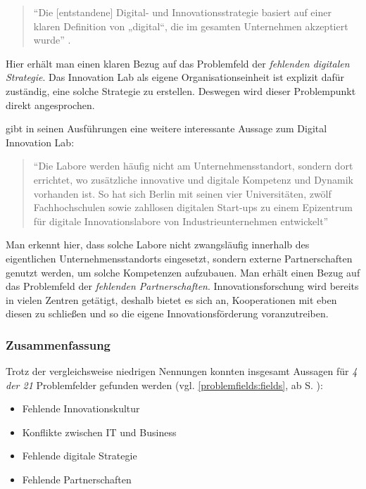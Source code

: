 \begin{quote}
	``Die [entstandene] Digital- und Innovationsstrategie basiert auf einer klaren Definition von „digital“, die im gesamten Unternehmen akzeptiert wurde'' \cite[S. 259]{urbach_digitalization_2018}.
\end{quote}

Hier erhält man einen klaren Bezug auf das Problemfeld der \textit{fehlenden digitalen Strategie}. Das Innovation Lab als eigene Organisationseinheit ist explizit dafür zuständig, eine solche Strategie zu erstellen. Deswegen wird dieser Problempunkt direkt angesprochen.

 gibt in seinen Ausführungen eine weitere interessante Aussage zum Digital Innovation Lab:

\begin{quote}
	``Die Labore werden häufig nicht am Unternehmensstandort, sondern dort errichtet, wo zusätzliche innovative und digitale Kompetenz und Dynamik vorhanden ist. So hat sich Berlin mit seinen vier Universitäten, zwölf Fachhochschulen sowie zahllosen digitalen Start-ups zu einem Epizentrum für digitale Innovationslabore von Industrieunternehmen entwickelt'' \cite[S. 183]{weinreich_lean_2016}
\end{quote}

Man erkennt hier, dass solche Labore nicht zwangsläufig innerhalb des eigentlichen Unternehmensstandorts eingesetzt, sondern externe Partnerschaften genutzt werden, um solche Kompetenzen aufzubauen. Man erhält einen Bezug auf das Problemfeld der \textit{fehlenden Partnerschaften}. Innovationsforschung wird bereits in vielen Zentren getätigt, deshalb bietet es sich an, Kooperationen mit eben diesen zu schließen und so die eigene Innovationsförderung voranzutreiben.

\subsubsection{Zusammenfassung}

Trotz der vergleichsweise niedrigen Nennungen konnten insgesamt Aussagen für \textit{4 der 21} Problemfelder gefunden werden (vgl. \ref{problemfields:fields}, ab S. \pageref{problemfields:fields}):

\begin{itemize}[noitemsep, topsep=0pt]
	\item Fehlende Innovationskultur
	\item Konflikte zwischen IT und Business
	\item Fehlende digitale Strategie
	\item Fehlende Partnerschaften
\end{itemize}

